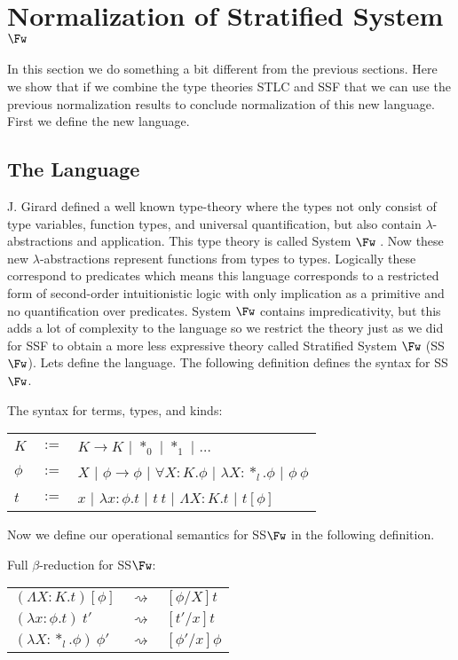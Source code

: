 \section{Normalization of Stratified System $\Fw$}
\label{subsec:normalization_stratified_system_fw}
In this section we do something a bit different from the previous
sections.  Here we show that if we combine the type theories STLC and
SSF that we can use the previous normalization results to conclude
normalization of this new language.  First we define the new language.

\subsection{The Language}
\label{subsec:the_language}
J. Girard defined a well known type-theory where the types not only
consist of type variables, function types, and universal
quantification, but also contain $\lambda$-abstractions and
application.  This type theory is called System $\Fw$
\cite{barendregt92}. Now these new $\lambda$-abstractions represent
functions from types to types.  Logically these correspond to
predicates which means this language corresponds to a restricted form
of second-order intuitionistic logic with only implication as a
primitive and no quantification over predicates.  System $\Fw$
contains impredicativity, but this adds a lot of complexity to the
language so we restrict the theory just as we did for SSF to obtain
a more less expressive theory called Stratified System $\Fw$ (SS$\Fw$).
Lets define the language.  The following definition defines the syntax
for SS$\Fw$.
\begin{definition}
  \label{def:syntax_ssfw}
  The syntax for terms, types, and kinds:
  \begin{center}
    \begin{tabular}{lll}
      $K$ & $:=$ & $K \to K$ $|$ $*_0$ $|$ $*_1$ $|$ $\ldots$\\
      $\phi$ & $:=$ & $X$   $|$ $\phi \rightarrow \phi$ $|$ $\forall X:K.\phi$ $|$ $\lambda X:*_l.\phi$ $|$ $\phi\ \phi$\\
      $t$ & $:=$ & $x$   $|$ $\lambda x:\phi.t$   $|$ $t\ t$ $|$ $\Lambda X:K.t$ $|$ $t[\phi]$\\
    \end{tabular}
  \end{center}
\end{definition}
\noindent Now we define our operational semantics for SS$\Fw$ in the following definition.
\begin{definition}
  \label{def:reduction_rules_ssf}
  Full $\beta$-reduction for SS$\Fw$:
  \begin{center}
    \begin{tabular}{lll}
      $(\Lambda X:K.t)[\phi]$     & $\rightsquigarrow$ & $[\phi/X]t$\\
      $(\lambda x:\phi.t)\ t'$      & $\rightsquigarrow$ & $[t'/x]t$\\
      $(\lambda X:*_l.\phi)\ \phi'$ & $\rightsquigarrow$ & $[\phi'/x]\phi$
    \end{tabular}
  \end{center}
\end{definition}

